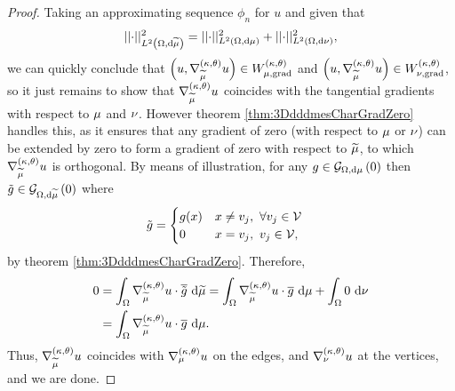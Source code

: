 \begin{proof}
	Taking an approximating sequence $\phi_n$ for $u$ and given that
	\begin{align*}
		\lvert\lvert \cdot \rvert\rvert_{L^{2}\left( \Omega,\mathrm{d} \widetilde{\mu} \right)}^2 = \lvert\lvert \cdot \rvert\rvert_{L^{2}\left( \Omega,\mathrm{d} \mu \right)}^2 + \lvert\lvert \cdot \rvert\rvert_{L^{2}\left( \Omega,\mathrm{d} \nu \right)}^2,
	\end{align*}
	we can quickly conclude that $\left( u,\nabla^{\left( \kappa, \theta \right)}_{\widetilde{\mu}}u \right)\in W_{\mu, \mathrm{grad}}^{\left( \kappa, \theta \right)}$ and $\left( u,\nabla^{\left( \kappa, \theta \right)}_{\widetilde{\mu}}u \right)\in W_{\nu, \mathrm{grad}}^{\left( \kappa, \theta \right)}$, so it just remains to show that $\nabla^{\left( \kappa, \theta \right)}_{\widetilde{\mu}}u$ coincides with the tangential gradients with respect to $\mu$ and $\nu$.
	However theorem \ref{thm:3DdddmesCharGradZero} handles this, as it ensures that any gradient of zero (with respect to $\mu$ or $\nu$) can be extended by zero to form a gradient of zero with respect to $\widetilde{\mu}$, to which $\nabla^{\left( \kappa, \theta \right)}_{\widetilde{\mu}}u$ is orthogonal.
	By means of illustration, for any $g\in\mathcal{G}_{ \Omega, \mathrm{d}\mu}\left( 0 \right)$ then $\tilde{g}\in\mathcal{G}_{ \Omega, \mathrm{d}\widetilde{\mu}}\left( 0 \right)$ where
	\begin{align*}
		\tilde{g} &= 
		\begin{cases} g(x) & x\neq v_j, \ \forall v_j\in\mathcal{V} \\ 0 & x=v_j, \ v_j\in\mathcal{V}, \end{cases}
	\end{align*}
	by theorem \ref{thm:3DdddmesCharGradZero}.
	Therefore,
	\begin{align*}
		0 &= \int_{\Omega} \nabla^{\left( \kappa, \theta \right)}_{\widetilde{\mu}}u\cdot\overline{\tilde{g}}  \ \mathrm{d}\widetilde{\mu}
		= \int_{\Omega} \nabla^{\left( \kappa, \theta \right)}_{\widetilde{\mu}}u\cdot\overline{g}  \ \mathrm{d}\mu + \int_{\Omega} 0  \ \mathrm{d}\nu \\
		&= \int_{\Omega} \nabla^{\left( \kappa, \theta \right)}_{\widetilde{\mu}}u\cdot\overline{g}  \ \mathrm{d}\mu.
	\end{align*}
	Thus, $\nabla^{\left( \kappa, \theta \right)}_{\widetilde{\mu}}u$ coincides with $\nabla^{\left( \kappa, \theta \right)}_{\mu}u$ on the edges, and $\nabla^{\left( \kappa, \theta \right)}_{\nu}u$ at the vertices, and we are done.
\end{proof}

